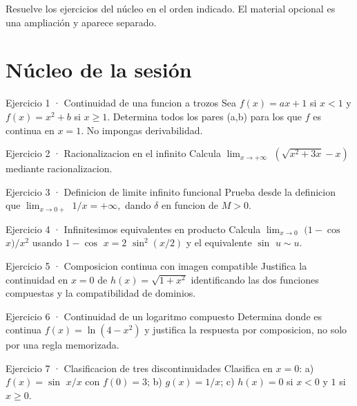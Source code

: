 \documentclass[10pt,a4paper,oneside,openany]{book}
\begin{document}
Resuelve los ejercicios del núcleo en el orden indicado. El material opcional es una ampliación y aparece separado.
\section*{Núcleo de la sesión}
\begin{PSevenExerciseFixed}{Ejercicio 1 · Continuidad de una funcion a trozos}
Sea \(f(x)=ax+1\) si \(x<1\) y \(f(x)=x^{2}+b\) si \(x\ge 1\). Determina todos los pares (a,b) para los que \(f\) es continua en \(x=1\). No impongas derivabilidad.
\end{PSevenExerciseFixed}
\begin{PSevenExerciseFixed}{Ejercicio 2 · Racionalizacion en el infinito}
Calcula \(\lim_{x\to +\infty }\) \((\sqrt{x^{2}+3x}-x)\) mediante racionalizacion.
\end{PSevenExerciseFixed}
\begin{PSevenExerciseFixed}{Ejercicio 3 · Definicion de limite infinito funcional}
Prueba desde la definicion que \(\lim_{x\to 0+}\) \(1/x=+\infty ,\) dando \(\delta \) en funcion de \(M>0\).
\end{PSevenExerciseFixed}
\begin{PSevenExerciseFixed}{Ejercicio 4 · Infinitesimos equivalentes en producto}
Calcula \(\lim_{x\to 0}\) \((1-\cos\) \(x)/x^{2}\) usando \(1-\cos\) \(x=2\) \(\sin^{2}(x/2)\) y el equivalente \(\sin\) \(u\sim u\).
\end{PSevenExerciseFixed}
\begin{PSevenExerciseFixed}{Ejercicio 5 · Composicion continua con imagen compatible}
Justifica la continuidad en \(x=0\) de \(h(x)=\sqrt{1+x^{2}}\) identificando las dos funciones compuestas y la compatibilidad de dominios.
\end{PSevenExerciseFixed}
\begin{PSevenExerciseFixed}{Ejercicio 6 · Continuidad de un logaritmo compuesto}
Determina donde es continua \(f(x)=\ln(4-x^{2})\) y justifica la respuesta por composicion, no solo por una regla memorizada.
\end{PSevenExerciseFixed}
\begin{PSevenExerciseFixed}{Ejercicio 7 · Clasificacion de tres discontinuidades}
Clasifica en \(x=0\): a) \(f(x)=\sin\) \(x/x\) con \(f(0)=3\); b) \(g(x)=1/x\); c) \(h(x)=0\) si \(x<0\) y \(1\) si \(x\ge 0\).
\end{PSevenExerciseFixed}
\end{document}
